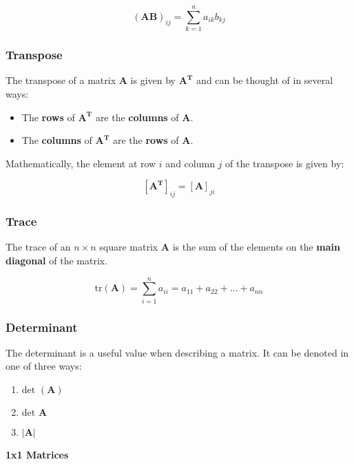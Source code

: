 \documentclass[11pt]{article}
\providecommand{\tightlist}{%
      \setlength{\itemsep}{0pt}\setlength{\parskip}{0pt}}
\begin{document}
\[(\mathbf{AB})_{ij} = \sum_{k=1}^n a_{ik}b_{kj}\]

\hypertarget{transpose}{%
\subsubsection{Transpose}\label{transpose}}

The transpose of a matrix \(\mathbf{A}\) is given by \(\mathbf{A^T}\)
and can be thought of in several ways:

\begin{itemize}
\tightlist
\item
  The \textbf{rows} of \(\mathbf{A^T}\) are the \textbf{columns} of
  \(\mathbf{A}\).
\item
  The \textbf{columns} of \(\mathbf{A^T}\) are the \textbf{rows} of
  \(\mathbf{A}\).
\end{itemize}

Mathematically, the element at row \(i\) and column \(j\) of the
transpose is given by:

\[[\mathbf{A^T}]_{ij} = [\mathbf{A}]_{ji}\]

\hypertarget{trace}{%
\subsubsection{Trace}\label{trace}}

The trace of an \(n\times n\) square matrix \(\mathbf{A}\) is the sum of
the elements on the \textbf{main diagonal} of the matrix.

\[\text{tr}\left(\mathbf{A}\right) = \sum_{i=1}^n a_{ii} = a_{11} + a_{22} + \dots + a_{nn}\]

\hypertarget{determinant}{%
\subsubsection{Determinant}\label{determinant}}

The determinant is a useful value when describing a matrix. It can be
denoted in one of three ways:

\begin{enumerate}
\def\labelenumi{\arabic{enumi}.}
\tightlist
\item
  \(\text{det } \left(\mathbf{A}\right)\)
\item
  \(\text{det } \mathbf{A}\)
\item
  \(|\mathbf{A}|\)
\end{enumerate}

\textbf{1x1 Matrices}
\end{document}
